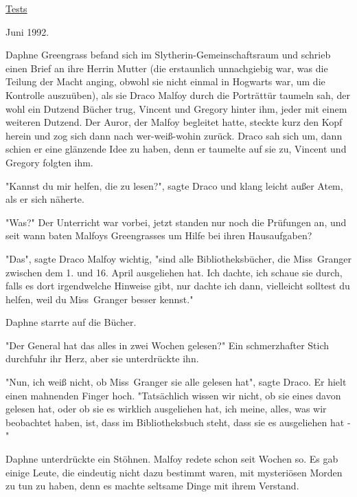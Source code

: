 

\hypertarget{tests}{%

\uline{Tests}

Juni 1992.

Daphne Greengrass befand sich im Slytherin-Gemeinschaftsraum und schrieb einen Brief an ihre Herrin Mutter (die erstaunlich unnachgiebig war, was die Teilung der Macht anging, obwohl sie nicht einmal in Hogwarts war, um die Kontrolle auszuüben), als sie Draco Malfoy durch die Porträttür taumeln sah, der wohl ein Dutzend Bücher trug, Vincent und Gregory hinter ihm, jeder mit einem weiteren Dutzend. Der Auror, der Malfoy begleitet hatte, steckte kurz den Kopf herein und zog sich dann nach wer-weiß-wohin zurück. Draco sah sich um, dann schien er eine glänzende Idee zu haben, denn er taumelte auf sie zu, Vincent und Gregory folgten ihm.

"Kannst du mir helfen, die zu lesen?", sagte Draco und klang leicht außer Atem, als er sich näherte.

"Was?" Der Unterricht war vorbei, jetzt standen nur noch die Prüfungen an, und seit wann baten Malfoys Greengrasses um Hilfe bei ihren Hausaufgaben?

"Das", sagte Draco Malfoy wichtig, "sind alle Bibliotheksbücher, die Miss~Granger zwischen dem 1. und 16. April ausgeliehen hat. Ich dachte, ich schaue sie durch, falls es dort irgendwelche Hinweise gibt, nur dachte ich dann, vielleicht solltest du helfen, weil du Miss~Granger besser kennst."

Daphne starrte auf die Bücher.

"Der General hat das alles in zwei Wochen gelesen?" Ein schmerzhafter Stich durchfuhr ihr Herz, aber sie unterdrückte ihn.

"Nun, ich weiß nicht, ob Miss~Granger sie alle gelesen hat", sagte Draco. Er hielt einen mahnenden Finger hoch. "Tatsächlich wissen wir nicht, ob sie eines davon gelesen hat, oder ob sie es wirklich ausgeliehen hat, ich meine, alles, was wir beobachtet haben, ist, dass im Bibliotheksbuch steht, dass sie es ausgeliehen hat -"

Daphne unterdrückte ein Stöhnen. Malfoy redete schon seit Wochen so. Es gab einige Leute, die eindeutig nicht dazu bestimmt waren, mit mysteriösen Morden zu tun zu haben, denn es machte seltsame Dinge mit ihrem Verstand.

}
